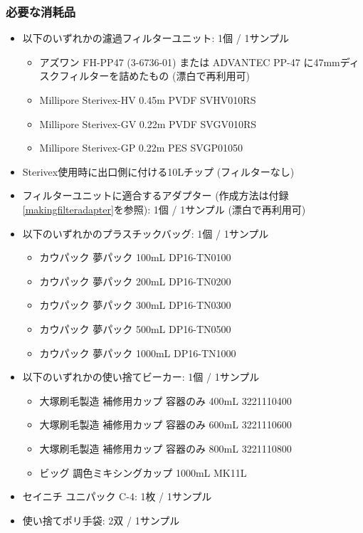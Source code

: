 \documentclass[titlepage,10pt,a4paper,uplatex]{jsbook}
\begin{document}
\subsubsection{必要な消耗品}
\begin{itemize}
\item 以下のいずれかの濾過フィルターユニット: 1個 / 1サンプル
\begin{itemize}
\item アズワン FH-PP47 (3-6736-01) または ADVANTEC PP-47 に47mmディスクフィルターを詰めたもの (漂白で再利用可)
\item Millipore Sterivex-HV 0.45{\textmu}m PVDF SVHV010RS
\item Millipore Sterivex-GV 0.22{\textmu}m PVDF SVGV010RS
\item Millipore Sterivex-GP 0.22{\textmu}m PES SVGP01050
\end{itemize}
\item Sterivex使用時に出口側に付ける10{\textmu}Lチップ (フィルターなし)
\item フィルターユニットに適合するアダプター (作成方法は付録\ref{makingfilteradapter}を参照): 1個 / 1サンプル (漂白で再利用可)
\item 以下のいずれかのプラスチックバッグ: 1個 / 1サンプル
\begin{itemize}
\item カウパック 夢パック 100mL DP16-TN0100
\item カウパック 夢パック 200mL DP16-TN0200
\item カウパック 夢パック 300mL DP16-TN0300
\item カウパック 夢パック 500mL DP16-TN0500
\item カウパック 夢パック 1000mL DP16-TN1000
\end{itemize}
\item 以下のいずれかの使い捨てビーカー: 1個 / 1サンプル
\begin{itemize}
\item 大塚刷毛製造 補修用カップ 容器のみ 400mL 3221110400
\item 大塚刷毛製造 補修用カップ 容器のみ 600mL 3221110600
\item 大塚刷毛製造 補修用カップ 容器のみ 800mL 3221110800
\item ビッグ 調色ミキシングカップ 1000mL MK11L
\end{itemize}
\item セイニチ ユニパック C-4: 1枚 / 1サンプル
\item 使い捨てポリ手袋: 2双 / 1サンプル
\end{itemize}
\end{document}
